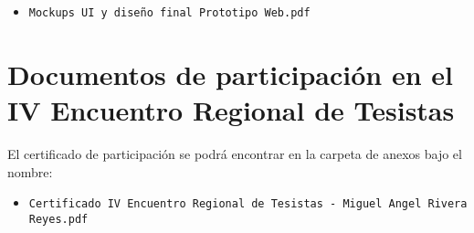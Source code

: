 \begin{itemize}
    \item \texttt{Mockups UI y diseño final Prototipo Web.pdf}
\end{itemize}

\section*{Documentos de participación en el IV Encuentro Regional de Tesistas}

El certificado de participación se podrá encontrar en la carpeta de anexos bajo el nombre:

\begin{itemize}
    \item \texttt{Certificado IV Encuentro Regional de Tesistas - Miguel Angel Rivera Reyes.pdf}
\end{itemize}